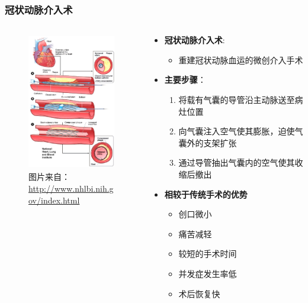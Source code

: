 \begin{frame}
\frametitle{冠状动脉介入术}
\begin{columns}[onlytextwidth]
\begin{column}{0.4\textwidth}
\begin{figure}[t]
\includegraphics[height=170pt]{../../Figures/background/phauthuatmachmau_stent.eps}
\caption[冠状动脉介入术]{图片来自：\\\url{http://www.nhlbi.nih.gov/index.html}}
\end{figure}
\end{column}
\begin{column}{0.5\textwidth}
\begin{itemize}
\item \textbf{冠状动脉介入术}: 
\begin{itemize}
\item \footnotesize{重建冠状动脉血运的微创介入手术}
\end{itemize}
\item \textbf{主要步骤}：
\begin{enumerate}[A]
\item \footnotesize{将载有气囊的导管沿主动脉送至病灶位置}
\item \footnotesize{向气囊注入空气使其膨胀，迫使气囊外的支架扩张}
\item \footnotesize{通过导管抽出气囊内的空气使其收缩后撤出}
\end{enumerate}
\end{itemize}
\begin{itemize}
\item \textbf{相较于传统手术的优势}
\begin{itemize}
\item 创口微小
\item 痛苦减轻
\item 较短的手术时间
\item 并发症发生率低
\item 术后恢复快
\end{itemize}
\end{itemize}
\end{column}
\end{columns}
\end{frame}

